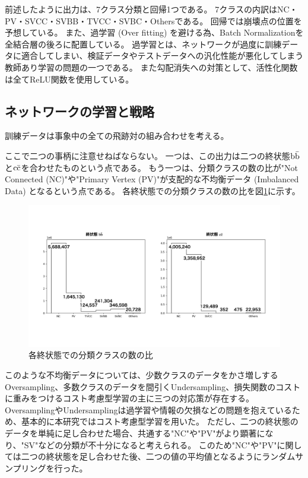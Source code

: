 前述したように出力は、7クラス分類と回帰1つである。
7クラスの内訳はNC・PV・SVCC・SVBB・TVCC・SVBC・Othersである。
回帰では崩壊点の位置を予想している。
また、過学習 (Over fitting) を避ける為、Batch Normalization\cite{BatchNormalizationpaper}を全結合層の後ろに配置している。
過学習とは、ネットワークが過度に訓練データに適合してしまい、検証データやテストデータへの汎化性能が悪化してしまう教師あり学習の問題の一つである。
また勾配消失への対策として、活性化関数は全てReLU関数を使用している。


\subsection{ネットワークの学習と戦略} \label{Net:PM:TrainingandStrategyofPM}

訓練データは事象中の全ての飛跡対の組み合わせを考える。

ここで二つの事柄に注意せねばならない。
一つは、この出力は二つの終状態$\rm b\bar{b}$と$\rm c\bar{c}$を合わせたものという点である。
もう一つは、分類クラスの数の比が"Not Connected (NC)"や"Primary Vertex (PV)"が支配的な不均衡データ (Imbalanced Data) となるという点である。
各終状態での分類クラスの数の比を図\ref{3-3-2-1ImbalancedData}に示す。

\begin{figure}[htbp]
 \centering
 \includegraphics[width=1.0\textwidth]{Figure/3Networks/3-3-2-1ImbalancedData.png}
 \caption{各終状態での分類クラスの数の比}
 \label{3-3-2-1ImbalancedData}
\end{figure}

このような不均衡データについては、少数クラスのデータをかさ増しするOversampling、多数クラスのデータを間引くUndersampling、損失関数のコストに重みをつけるコスト考慮型学習の主に三つの対応策が存在する。
OversamplingやUndersamplingは過学習や情報の欠損などの問題を抱えているため、基本的に本研究ではコスト考慮型学習を用いた。
ただし、二つの終状態のデータを単純に足し合わせた場合、共通する"NC"や"PV"がより顕著になり、"SV"などの分類が不十分になると考えられる。
このため"NC"や"PV"に関しては二つの終状態を足し合わせた後、二つの値の平均値となるようにランダムサンプリングを行った。

